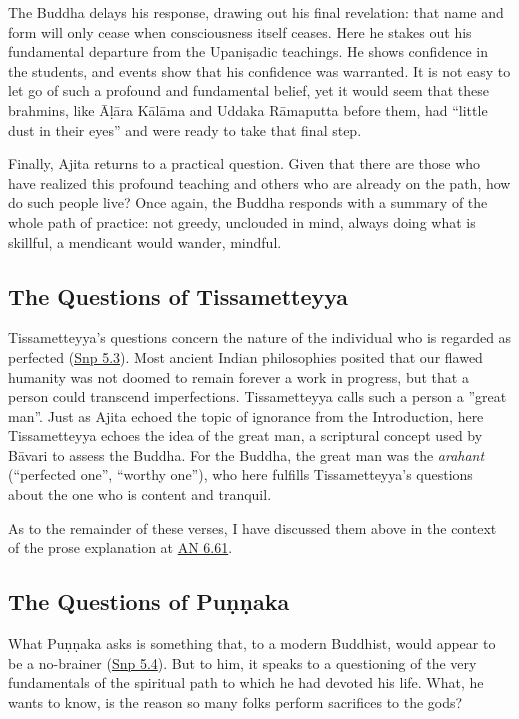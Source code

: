 \documentclass[12pt,openany]{book}%
\begin{document}
The Buddha delays his response, drawing out his final revelation: that name and form will only cease when consciousness itself ceases. Here he stakes out his fundamental departure from the \textsanskrit{Upaniṣadic} teachings. He shows confidence in the students, and events show that his confidence was warranted. It is not easy to let go of such a profound and fundamental belief, yet it would seem that these brahmins, like \textsanskrit{Āḷāra} \textsanskrit{Kālāma} and Uddaka \textsanskrit{Rāmaputta} before them, had “little dust in their eyes” and were ready to take that final step.

Finally, Ajita returns to a practical question. Given that there are those who have realized this profound teaching and others who are already on the path, how do such people live? Once again, the Buddha responds with a summary of the whole path of practice: not greedy, unclouded in mind, always doing what is skillful, a mendicant would wander, mindful.

\subsection*{The Questions of Tissametteyya}

Tissametteyya’s questions concern the nature of the individual who is regarded as perfected (\href{https://suttacentral.net/snp5.3/en/sujato}{Snp 5.3}). Most ancient Indian philosophies posited that our flawed humanity was not doomed to remain forever a work in progress, but that a person could transcend imperfections. Tissametteyya calls such a person a ”great man”. Just as Ajita echoed the topic of ignorance from the Introduction, here Tissametteyya echoes the idea of the great man, a scriptural concept used by \textsanskrit{Bāvari} to assess the Buddha. For the Buddha, the great man was the \textit{arahant} (“perfected one”, “worthy one”), who here fulfills Tissametteyya’s questions about the one who is content and tranquil.

As to the remainder of these verses, I have discussed them above in the context of the prose explanation at \href{https://suttacentral.net/an6.61/en/sujato}{AN 6.61}.

\subsection*{The Questions of \textsanskrit{Puṇṇaka}}

What \textsanskrit{Puṇṇaka} asks is something that, to a modern Buddhist, would appear to be a no-brainer (\href{https://suttacentral.net/snp5.4/en/sujato}{Snp 5.4}). But to him, it speaks to a questioning of the very fundamentals of the spiritual path to which he had devoted his life. What, he wants to know, is the reason so many folks perform sacrifices to the gods?
\end{document}
